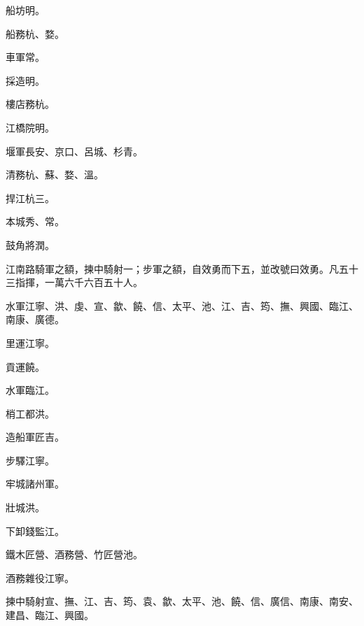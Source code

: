 \begin{pinyinscope}
 船坊明。



 船務杭、婺。



 車軍常。



 採造明。



 樓店務杭。



 江橋院明。



 堰軍長安、京口、呂城、杉青。



 清務杭、蘇、婺、溫。



 捍江杭三。



 本城秀、常。



 鼓角將潤。



 江南路騎軍之額，揀中騎射一；步軍之額，自效勇而下五，並改號曰效勇。凡五十三指揮，一萬六千六百五十人。



 水軍江寧、洪、虔、宣、歙、饒、信、太平、池、江、吉、筠、撫、興國、臨江、南康、廣德。



 里運江寧。



 貢運饒。



 水軍臨江。



 梢工都洪。



 造船軍匠吉。



 步驛江寧。



 牢城諸州軍。



 壯城洪。



 下卸錢監江。



 鐵木匠營、酒務營、竹匠營池。



 酒務雜役江寧。



 揀中騎射宣、撫、江、吉、筠、袁、歙、太平、池、饒、信、廣信、南康、南安、建昌、臨江、興國。




\end{pinyinscope}
